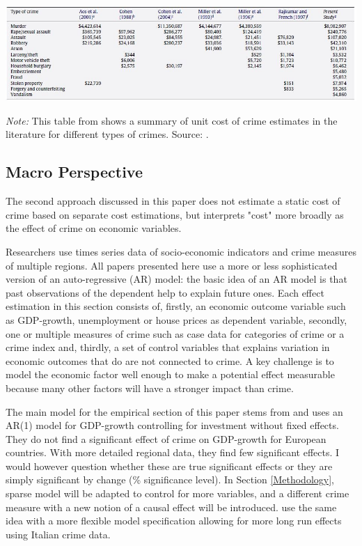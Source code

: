 \documentclass[a4paper,12pt]{article}
\begin{document}
\begin{table}
\begin{minipage}{0.9\textwidth}
  \includegraphics[trim={0 0 0 0},width=\linewidth]{charts/tab_lit_review.jpg}
\begin{flushleft}
\footnotesize{\textit{Note:} This table from \cite{collister} shows a summary of unit cost of crime estimates in the literature for different types of crimes. Source: \cite{collister}.
\label{tab:unit_cost_crime_lit_review}	
}
\end{flushleft}
\end{minipage}
\end{table}

\subsection{Macro Perspective}
The second approach discussed in this paper does not estimate a static cost of crime based on separate cost estimations, but interprets "cost" more broadly as the effect of crime on economic variables. 

Researchers use times series data of socio-economic indicators and crime measures of multiple regions. All papers presented here use a more or less sophisticated version of an auto-regressive (AR) model: the basic idea of an AR model is that past observations of the dependent help to explain future ones. 
Each effect estimation in this section consists of, firstly, an economic outcome variable such as GDP-growth, unemployment or house prices as dependent variable, secondly, one or multiple measures of crime such as case data for categories of crime or a crime index and, thirdly, a set of control variables that explains variation in economic outcomes that do are not connected to crime. 
A key challenge is to model the economic factor well enough to make a potential effect measurable because many other factors will have a stronger impact than crime.

The main model for the empirical section of this paper stems from \cite{entorf} and uses an AR(1) model for GDP-growth controlling for investment without fixed effects. They do not find a significant effect of crime on GDP-growth for European countries. With more detailed regional data, they find few significant effects. I would however question whether these are true significant effects or they are simply significant by change (\% significance level).
In Section \ref{Methodology}, \cite{entorf} sparse model will be adapted to control for more variables, and a different crime measure with a new notion of a causal effect will be introduced.
\cite{detotto} use the same idea with a more flexible model specification allowing for more long run effects using Italian crime data.
\end{document}
